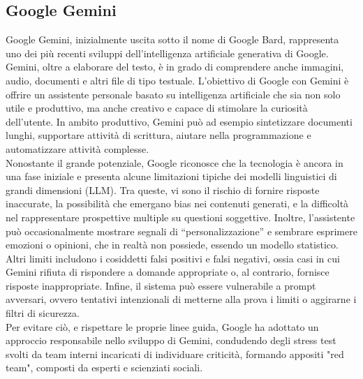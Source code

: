 \subsection{Google Gemini}
Google Gemini, inizialmente uscita sotto il nome di Google Bard, rappresenta uno dei più recenti sviluppi dell'intelligenza artificiale generativa di Google. Gemini, oltre a elaborare del testo, è in grado di comprendere anche immagini, audio, documenti e altri file di tipo testuale.
L'obiettivo di Google con Gemini è offrire un assistente personale basato su intelligenza artificiale che sia non solo utile e produttivo, ma anche creativo e capace di stimolare la curiosità dell'utente. In ambito produttivo, Gemini può ad esempio sintetizzare documenti lunghi, supportare attività di scrittura, aiutare nella programmazione e automatizzare attività complesse.\\
Nonostante il grande potenziale, Google riconosce che la tecnologia è ancora in una fase iniziale e presenta alcune limitazioni tipiche dei modelli linguistici di grandi dimensioni (LLM). Tra queste, vi sono il rischio di fornire risposte inaccurate, la possibilità che emergano bias nei contenuti generati, e la difficoltà nel rappresentare prospettive multiple su questioni soggettive. Inoltre, l'assistente può occasionalmente mostrare segnali di “personalizzazione” e sembrare esprimere emozioni o opinioni, che in realtà non possiede, essendo un modello statistico. Altri limiti includono i cosiddetti falsi positivi e falsi negativi, ossia casi in cui Gemini rifiuta di rispondere a domande appropriate o, al contrario, fornisce risposte inappropriate. Infine, il sistema può essere vulnerabile a prompt avversari, ovvero tentativi intenzionali di metterne alla prova i limiti o aggirarne i filtri di sicurezza.\\
Per evitare ciò, e rispettare le proprie linee guida, Google ha adottato un approccio responsabile nello sviluppo di Gemini, condudendo degli stress test svolti da team interni incaricati di individuare criticità, formando appositi "red team", composti da esperti e scienziati sociali.\cite{GeminiLaunch} \cite{GeminiAppOverview}
